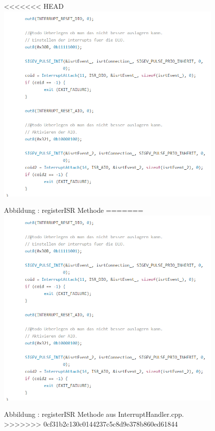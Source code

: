 \documentclass[a4paper, 11pt]{article}
\begin{document}
\begin{figure}[h]
\centering 
<<<<<<< HEAD
    \includegraphics[scale=0.7]{ISR/regisr.png}
    
    \small Abbildung \theimgcounter : registerISR Methode
=======
    \includegraphics[scale=0.6]{ISR/regisr.png}
    
    \small Abbildung \theimgcounter : registerISR Methode aus InterruptHandler.cpp.
>>>>>>> 0cf31b2c130c0144237c5c8d9e378b860ed61844
    \label{regisr}
\end{figure}
\end{document}
